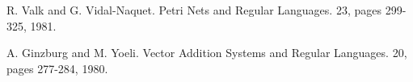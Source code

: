\documentclass[a4paper,final]{article}
\theoremstyle{definition}
\begin{document}

\begin{thebibliography}{10}

R. Valk and G. Vidal-Naquet.
\newblock Petri Nets and Regular Languages.
 23, pages 299-325, 1981.

A. Ginzburg and M. Yoeli.
\newblock Vector Addition Systems and Regular Languages.
 20, pages 277-284, 1980.

\end{thebibliography}
\end{document}
